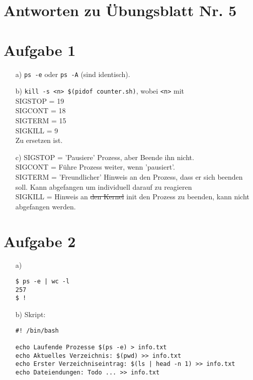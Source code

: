 \documentclass{scrartcl}
\begin{document}
\section*{Antworten zu Übungsblatt Nr. 5}

\section*{Aufgabe 1}
\begin{itemize}
\item[a)]
    \verb$ps -e$ oder \verb$ps -A$ (sind identisch).
\item[b)]
    \verb!kill -s <n> $(pidof counter.sh)!, wobei \verb$<n>$ mit \\
    SIGSTOP = 19 \\
    SIGCONT = 18 \\
    SIGTERM = 15 \\
    SIGKILL = 9 \\
    Zu ersetzen ist.

\item[c)]
    SIGSTOP = 'Pausiere' Prozess, aber Beende ihn nicht. \\
    SIGCONT = Führe Prozess weiter, wenn 'pausiert'. \\
    SIGTERM = 'Freundlicher' Hinweis an den Prozess, dass er sich beenden soll. Kann abgefangen um individuell darauf
    zu reagieren \\
    SIGKILL = Hinweis an \sout{den Kernel} init den Prozess zu beenden, kann nicht abgefangen werden. \\

\end{itemize}


\section*{Aufgabe 2}
\begin{itemize}
\item[a)]
\begin{verbatim}
$ ps -e | wc -l
257
$ !
\end{verbatim}
\item[b)] Skript: \\
\begin{verbatim}
#! /bin/bash

echo Laufende Prozesse $(ps -e) > info.txt
echo Aktuelles Verzeichnis: $(pwd) >> info.txt
echo Erster Verzeichniseintrag: $(ls | head -n 1) >> info.txt
echo Dateiendungen: Todo ... >> info.txt

\end{verbatim}

\end{itemize}
\end{document}
